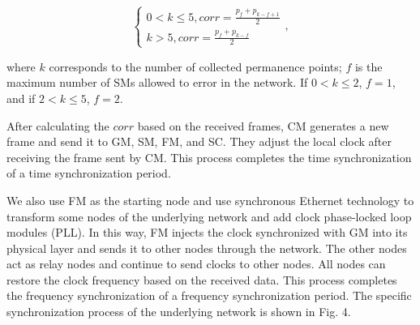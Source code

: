 \documentclass[conference]{IEEEtran}
\begin{document}
\begin{equation}
\left\{ {\begin{array}{*{20}{l}}
{0 < k \le 5,corr = \frac{{{p_f} + {p_{k - f + 1}}}}{2}}\\
{k > 5,corr = \frac{{{p_f} + {p_{k - f}}}}{2}}
\end{array}} \right.,
\label {eq13}
\end{equation}

\noindent where $k$ corresponds to the number of collected permanence points; $f$ is the maximum number of SMs allowed to error in the network. If $0<k\le2$, $f=1$, and if $2<k\le5$, $f=2$.

After calculating the $corr$ based on the received frames, CM generates a new frame and send it to GM, SM, FM, and SC. They adjust the local clock after receiving the frame sent by CM. This process completes the time synchronization of a time synchronization period.

We also use FM as the starting node and use synchronous Ethernet technology to transform some nodes of the underlying network and add clock phase-locked loop modules (PLL). In this way, FM injects the clock synchronized with GM into its physical layer and sends it to other nodes through the network. The other nodes act as relay nodes and continue to send clocks to other nodes. All nodes can restore the clock frequency based on the received data. This process completes the frequency synchronization of a frequency synchronization period. The specific synchronization process of the underlying network is shown in Fig. 4.
\end{document}
